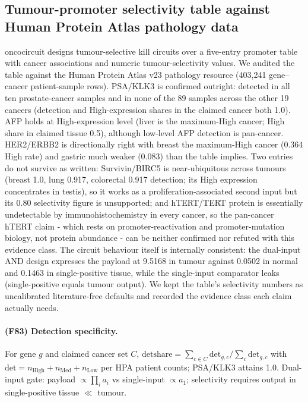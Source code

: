 \subsection{Tumour-promoter selectivity table against Human Protein Atlas pathology data}
oncocircuit designs tumour-selective kill circuits over a five-entry promoter table with cancer associations and numeric tumour-selectivity values. We audited the table against the Human Protein Atlas v23 pathology resource (403,241 gene--cancer patient-sample rows). PSA/KLK3 is confirmed outright: detected in all ten prostate-cancer samples and in none of the 89 samples across the other 19 cancers (detection and High-expression shares in the claimed cancer both 1.0). AFP holds at High-expression level (liver is the maximum-High cancer; High share in claimed tissue 0.5), although low-level AFP detection is pan-cancer. HER2/ERBB2 is directionally right with breast the maximum-High cancer (0.364 High rate) and gastric much weaker (0.083) than the table implies. Two entries do not survive as written: Survivin/BIRC5 is near-ubiquitous across tumours (breast 1.0, lung 0.917, colorectal 0.917 detection; its High expression concentrates in testis), so it works as a proliferation-associated second input but its 0.80 selectivity figure is unsupported; and hTERT/TERT protein is essentially undetectable by immunohistochemistry in every cancer, so the pan-cancer hTERT claim - which rests on promoter-reactivation and promoter-mutation biology, not protein abundance - can be neither confirmed nor refuted with this evidence class. The circuit behaviour itself is internally consistent: the dual-input AND design expresses the payload at 9.5168 in tumour against 0.0502 in normal and 0.1463 in single-positive tissue, while the single-input comparator leaks (single-positive equals tumour output). We kept the table's selectivity numbers as uncalibrated literature-free defaults and recorded the evidence class each claim actually needs.
\paragraph{(F83) Detection specificity.} For gene $g$ and claimed cancer set $C$, $\mathrm{detshare}=\sum_{c\in C}\mathrm{det}_{g,c}/\sum_{c}\mathrm{det}_{g,c}$ with $\mathrm{det}=n_{\mathrm{High}}+n_{\mathrm{Med}}+n_{\mathrm{Low}}$ per HPA patient counts; PSA/KLK3 attains 1.0. Dual-input gate: payload $\propto\prod_i a_i$ vs single-input $\propto a_1$; selectivity requires output in single-positive tissue $\ll$ tumour.
